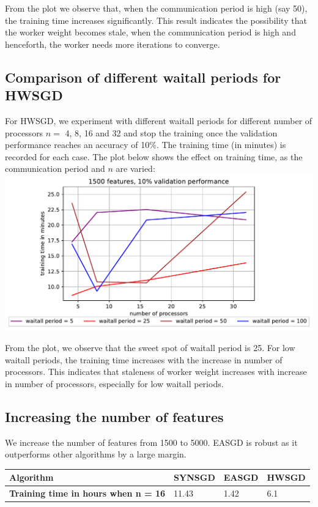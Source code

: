 \documentclass[12pt]{article}
\begin{document}
From the plot we observe that, when the communication period is high (say 50), the training time increases significantly. This result indicates the possibility that the worker weight becomes stale, when the communication period is high and henceforth, the worker needs more iterations to converge.

\subsection{Comparison of different waitall periods for HWSGD}
For HWSGD, we experiment with different waitall periods for different number of processors $n=$ 4, 8, 16 and 32 and stop the training once the validation performance reaches an accuracy of 10\%. The  training  time (in  minutes)  is  recorded  for  each  case. The plot below shows the effect on training time, as the communication period and $n$ are varied:\\

{\centering
\includegraphics[width=14cm]{images/1500f_10v_hw.pdf}\\
}

From the plot, we observe that the sweet spot of waitall period is 25. For low waitall periods, the training time increases with the increase in number of processors. This indicates that staleness of worker weight increases with increase in number of processors, especially for low waitall periods.


\subsection{Increasing the number of features}
We increase the number of features from 1500 to 5000. EASGD is robust as it outperforms other algorithms by a large margin. 

\begin{table}[ht]
\centering
 \begin{tabular}{llll} 
 \toprule
\textbf{Algorithm} & SYNSGD & EASGD & HWSGD \\ \midrule
\textbf{Training time in hours when n = 16} & 11.43 & 1.42 & 6.1 \\
\bottomrule
\end{tabular}
\end{table}
\end{document}
